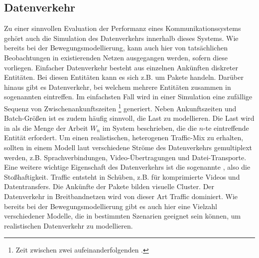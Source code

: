 \documentclass[12pt, a4paper]{article}
\begin{document}
\subsection{Datenverkehr}
\label{sec:traffic}

Zu einer sinnvollen Evaluation der Performanz eines Kommunikationssystems gehört auch die Simulation des Datenverkehrs
innerhalb dieses Systems. Wie bereits bei der Bewegungsmodellierung, kann auch hier von tatsächlichen Beobachtungen in
existierenden Netzen ausgegangen werden, sofern diese vorliegen.\newline
Einfacher Datenverkehr besteht aus einzelnen Ankünften diskreter Entitäten.
Bei diesen Entitäten kann es sich z.B. um Pakete handeln. Darüber hinaus gibt es Datenverkehr, 
bei welchem mehrere Entitäten zusammen in sogenannten  eintreffen.
Im einfachsten Fall wird in einer Simulation eine zufällige Sequenz von Zwischenankunftszeiten \footnote{Zeit zwischen zwei 
aufeinanderfolgenden .} generiert. Neben Ankunftszeiten und Batch-Größen ist es zudem häufig sinnvoll,
die Last zu modellieren. \cite{Frost1994} Die Last wird in \cite{Frost1994} als die Menge der Arbeit $W_n$ im System beschrieben,
die die $n$-te eintreffende Entität erfordert.
Um einen realistischen, heterogenen Traffic-Mix zu erhalten, sollten in einem Modell laut \cite{Frost1994} verschiedene
Ströme des Datenverkehrs gemultiplext werden, z.B. Sprachverbindungen, Video-Übertragungen und Datei-Transporte.
Eine weitere wichtige Eigenschaft des Datenverkehrs ist die sogenannte , also die Stoßhaftigkeit.
Traffic entsteht in Schüben, z.B. für komprimierte Videos und Datentransfers. Die Ankünfte der Pakete bilden visuelle
Cluster. Der Datenverkehr in Breitbandnetzen wird von dieser Art Traffic dominiert. \cite{Frost1994}
\newline\newline
Wie bereits bei der Bewegungsmodellierung gibt es auch hier eine Vielzahl verschiedener Modelle, die in bestimmten Szenarien
geeignet sein können, um realistischen Datenverkehr zu modellieren.
\end{document}
